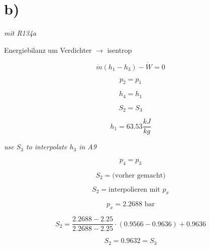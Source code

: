 

\section*{b)}

\textit{mit R134a}

Energiebilanz um Verdichter $\rightarrow$ isentrop

\[
\dot{m} (h_1 - h_3) - \dot{W} = 0
\]

\[
p_2 = p_1
\]

\[
h_4 = h_1
\]

\[
S_2 = S_3
\]

\[
h_1 = 63.53 \frac{kJ}{kg}
\]

\textit{use $S_3$ to interpolate $h_3$ in A9}

\[
p_4 = p_3
\]

\[
S_2 = \text{(vorher gemacht)}
\]

\[
S_2 = \text{interpolieren mit } p_x
\]

\[
p_x = 2.2688 \text{ bar}
\]

\[
S_2 = \frac{2.2688 - 2.25}{2.2688 - 2.25} \cdot (0.9566 - 0.9636) + 0.9636
\]

\[
S_2 = 0.9632 = S_3
\]